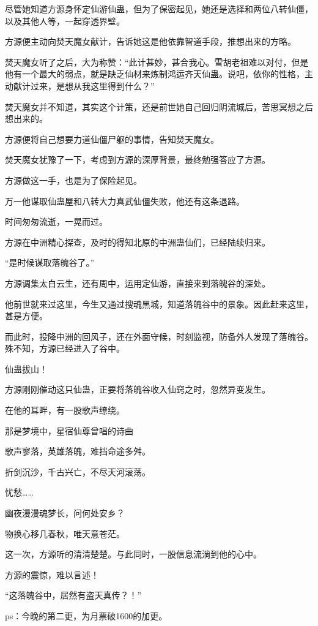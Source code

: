\begin{this_body}
尽管她知道方源身怀定仙游仙蛊，但为了保密起见，她还是选择和两位八转仙僵，以及其他人等，一起穿透界壁。

方源便主动向焚天魔女献计，告诉她这是他依靠智道手段，推想出来的方略。

焚天魔女听了之后，大为称赞：“此计甚妙，甚合我心。雪胡老祖难以对付，但是他有一个最大的弱点，就是缺乏仙材来炼制鸿运齐天仙蛊。说吧，依你的性格，主动献计过来，是想从我这里得到什么？”

焚天魔女并不知道，其实这个计策，还是前世她自己回归阴流城后，苦思冥想之后想出来的。

方源便将自己想要力道仙僵尸躯的事情，告知焚天魔女。

焚天魔女犹豫了一下，考虑到方源的深厚背景，最终勉强答应了方源。

方源做这一手，也是为了保险起见。

万一他谋取仙蛊屋和八转大力真武仙僵失败，他还有这条退路。

时间匆匆流逝，一晃而过。

方源在中洲精心探查，及时的得知北原的中洲蛊仙们，已经陆续归来。

“是时候谋取落魄谷了。”

方源调集太白云生，还有周中，运用定仙游，直接来到落魄谷的深处。

他前世就来过这里，今生又通过搜魂黑城，知道落魄谷中的景象。因此赶来这里，甚是方便。

而此时，投降中洲的回风子，还在外面守候，时刻监视，防备外人发现了落魄谷。殊不知，方源已经进入了谷中。

仙蛊拔山！

方源刚刚催动这只仙蛊，正要将落魄谷收入仙窍之时，忽然异变发生。

在他的耳畔，有一股歌声缭绕。

那是梦境中，星宿仙尊曾唱的诗曲

歌声寥落，英雄落魄，难挡命途多舛。

折剑沉沙，千古兴亡，不尽天河滚荡。

忧愁……

幽夜漫漫魂梦长，问何处安乡？

物换心移几春秋，唯天意苍茫。

这一次，方源听的清清楚楚。与此同时，一股信息流淌到他的心中。

方源的震惊，难以言述！

“这落魄谷中，居然有盗天真传？！”

ps：今晚的第二更，为月票破1600的加更。

\end{this_body}


